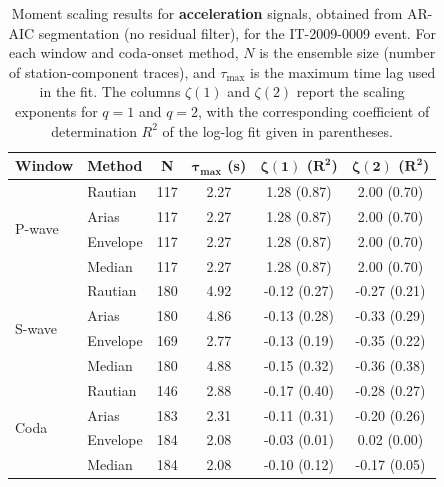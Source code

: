 \begin{table}[H]
\centering
\small
\begin{tabular}{llcccc}
\toprule
\textbf{Window} & \textbf{Method} & \textbf{N} & $\bm{\tau_{\max}}$ \textbf{(s)} & $\bm{\zeta(1)}$ \textbf{(}$\bm{R^2}$\textbf{)} & $\bm{\zeta(2)}$ \textbf{(}$\bm{R^2}$\textbf{)} \\
\midrule
\multirow{4}{*}{P-wave}
& Rautian & 117 & 2.27 & 1.28 (0.87) & 2.00 (0.70) \\
& Arias & 117 & 2.27 & 1.28 (0.87) & 2.00 (0.70) \\
& Envelope & 117 & 2.27 & 1.28 (0.87) & 2.00 (0.70) \\
& Median & 117 & 2.27 & 1.28 (0.87) & 2.00 (0.70) \\
\midrule
\multirow{4}{*}{S-wave}
& Rautian & 180 & 4.92 & -0.12 (0.27) & -0.27 (0.21) \\
& Arias & 180 & 4.86 & -0.13 (0.28) & -0.33 (0.29) \\
& Envelope & 169 & 2.77 & -0.13 (0.19) & -0.35 (0.22) \\
& Median & 180 & 4.88 & -0.15 (0.32) & -0.36 (0.38) \\
\midrule
\multirow{4}{*}{Coda}
& Rautian & 146 & 2.88 & -0.17 (0.40) & -0.28 (0.27) \\
& Arias & 183 & 2.31 & -0.11 (0.31) & -0.20 (0.26) \\
& Envelope & 184 & 2.08 & -0.03 (0.01) & 0.02 (0.00) \\
& Median & 184 & 2.08 & -0.10 (0.12) & -0.17 (0.05) \\
\bottomrule
\end{tabular}
\caption{Moment scaling results for \textbf{acceleration} signals, obtained from AR-AIC segmentation (no residual filter), for the IT-2009-0009 event. For each window and coda-onset method, $N$ is the ensemble size (number of station-component traces), and $\tau_{\max}$ is the maximum time lag used in the fit. The columns $\zeta(1)$ and $\zeta(2)$ report the scaling exponents for $q=1$ and $q=2$, with the corresponding coefficient of determination $R^2$ of the log-log fit given in parentheses.}
\label{tab:ar_aic_scaling_acc_nothresh_laquila}
\end{table}